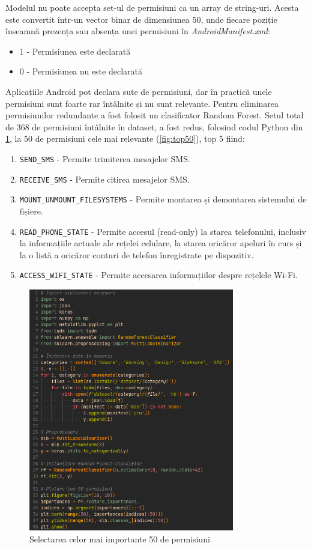 \documentclass[12pt,a4paper]{report}
\begin{document}
Modelul nu poate accepta set-ul de permisiuni ca un array de string-uri.
Acesta este convertit într-un vector binar de dimensiunea 50,
unde fiecare poziție înseamnă prezența sau absența unei permisiuni în \textit{AndroidManifest.xml}:
\begin{itemize}
      \item 1 - Permisiunea este declarată
      \item 0 - Permisiunea nu este declarată
\end{itemize}
Aplicațiile Android pot declara sute de permisiuni, dar în practică unele permisiuni sunt foarte rar întâlnite și nu sunt relevante.
Pentru eliminarea permisiunilor redundante a fost folosit un clasificator Random Forest\cite{breiman2001random}\cite{Khariwal2021}.
Setul total de 368 de permisiuni întâlnite în dataset, a fost redus, folosind codul Python din \cref{fig:rf_train}, la 50 de permisiuni cele mai relevante (\cref{fig:top50}), top 5 fiind:
\begin{enumerate}
      \item \texttt{SEND\_SMS} - Permite trimiterea mesajelor SMS.
      \item \texttt{RECEIVE\_SMS} - Permite citirea mesajelor SMS.
      \item \texttt{MOUNT\_UNMOUNT\_FILESYSTEMS} - Permite montarea și demontarea sistemului de fișiere.
      \item \texttt{READ\_PHONE\_STATE} - Permite accesul (read-only) la starea telefonului, inclusiv la informațiile actuale ale rețelei celulare, la starea oricăror apeluri în curs și la o listă a oricăror conturi de telefon înregistrate pe dispozitiv.
      \item \texttt{ACCESS\_WIFI\_STATE} - Permite accesarea informațiilor despre rețelele Wi-Fi.
\end{enumerate}
\begin{figure}[H]
      \centering
      \includegraphics[width=0.8\textwidth]{visuals/rf_train.png}
      \caption{Selectarea celor mai importante 50 de permisiuni}
      \label{fig:rf_train}
\end{figure}
\end{document}
